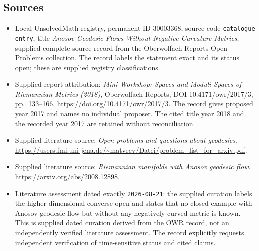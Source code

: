 \documentclass[11pt]{article}
\begin{document}
\subsection{Sources}
\begin{itemize}
\item Local UnsolvedMath registry, permanent ID \(30003368\), source code \texttt{catalogue entry}, title \emph{Anosov Geodesic Flows Without Negative Curvature Metrics}; supplied complete source record from the Oberwolfach Reports Open Problems collection. The record labels the statement exact and its status open; these are supplied registry classifications.
\item Supplied report attribution: \emph{Mini-Workshop: Spaces and Moduli Spaces of Riemannian Metrics (2018)}, Oberwolfach Reports, DOI 10.4171/owr/2017/3, pp.~133--166. \url{https://doi.org/10.4171/owr/2017/3}. The record gives proposed year 2017 and names no individual proposer. The cited title year 2018 and the recorded year 2017 are retained without reconciliation.
\item Supplied literature source: \emph{Open problems and questions about geodesics}. \url{https://users.fmi.uni-jena.de/~matveev/Datei/problem_list_for_arxiv.pdf}.
\item Supplied literature source: \emph{Riemannian manifolds with Anosov geodesic flow}. \url{https://arxiv.org/abs/2008.12898}.
\item Literature assessment dated exactly \texttt{2026-08-21}: the supplied curation labels the higher-dimensional converse open and states that no closed example with Anosov geodesic flow but without any negatively curved metric is known. This is supplied dated curation derived from the OWR record, not an independently verified literature assessment. The record explicitly requests independent verification of time-sensitive status and cited claims.
\end{itemize}
\end{document}
